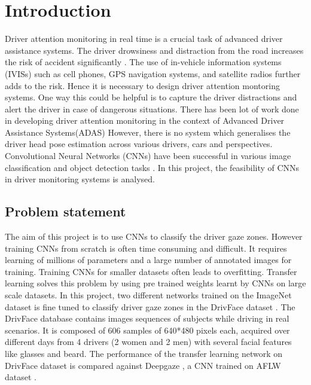 \documentclass[a4paper, 12pt, oneside, BCOR1cm,toc=chapterentrywithdots]{scrbook}
\begin{document}
\onecolumn

\chapter{Introduction}
 Driver attention monitoring in real time is a crucial task of advanced driver assistance systems. The driver drowsiness and distraction from the road increases the risk of accident significantly \cite{noauthor_impact_nodate} \cite{liang_how_2012}. The use of in-vehicle information systems (IVISs) such as cell phones, GPS navigation systems, and satellite radios further adds to the risk. \cite{strayer_cell_2003} \cite{lee_speech-based_2001}Hence it is necessary to design driver attention montoring systems. One way this could be helpful is to capture the driver distractions and alert the driver in case of dangerous situations. There has been lot of work done in developing driver attention monitoring in the context of Advanced Driver Assistance Systems(ADAS) \cite{liang_real-time_2007} However, there is no system which generalises the driver head pose estimation across various drivers, cars and perspectives. Convolutional Neural Networks (CNNs) have been successful in various image classification and object detection tasks \cite{krizhevsky_imagenet_2017}. In this project, the feasibility of CNNs in driver monitoring systems is analysed. 
 
\section{Problem statement}
 
The aim of this project is to use CNNs to classify the driver gaze zones. However training CNNs from scratch is often time consuming and difficult. It requires learning of millions of parameters and a large number of annotated images for training. Training CNNs for smaller datasets often leads to overfitting. Transfer learning solves this problem by using pre trained weights learnt by CNNs on large scale datasets. \cite{noauthor_survey_nodate} In this project, two different networks trained on the ImageNet \cite{krizhevsky_imagenet_2012} dataset is fine tuned to classify driver gaze zones in the DrivFace dataset \cite{noauthor_uci_nodate}. The DrivFace database contains images sequences of subjects while driving in real scenarios. It is composed of 606 samples of 640*480 pixels each, acquired over different days from 4 drivers (2 women and 2 men) with several facial features like glasses and beard. The performance of the transfer learning network on DrivFace dataset is compared against Deepgaze \cite{noauthor_head_nodate} , a CNN trained on AFLW dataset \cite{noauthor_icg_nodate}.
\end{document}
